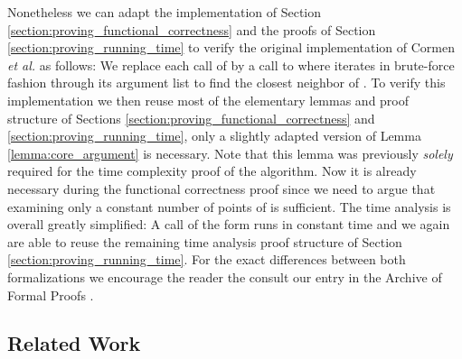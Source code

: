 \begin{isabellebody}
\begin{isamarkuptext}
Nonetheless we can adapt the implementation of Section \ref{section:proving_functional_correctness} and the proofs
of Section \ref{section:proving_running_time} to verify the original implementation of Cormen \emph{et al.} as follows:
We replace each call of  by a call to 
where  iterates in brute-force fashion through its argument list to find the
closest neighbor of . To verify this implementation we then reuse most of the elementary lemmas and proof
structure of Sections \ref{section:proving_functional_correctness} and \ref{section:proving_running_time},
only a slightly adapted version of Lemma \ref{lemma:core_argument} is necessary. Note that this lemma was
previously \emph{solely} required for the time complexity proof of the algorithm. Now it is already necessary
during the functional correctness proof since we need to argue that examining only a constant number of
points of  is sufficient. The time analysis is overall greatly simplified: A call of the form
 runs in constant time and we again are able to reuse the remaining
time analysis proof structure of Section \ref{section:proving_running_time}. For the exact differences
between both formalizations we encourage the reader the consult our entry in the Archive of Formal Proofs
\cite{Closest_Pair_Points-AFP}.

\subsection{Related Work}


\end{isamarkuptext}
\end{isabellebody}
